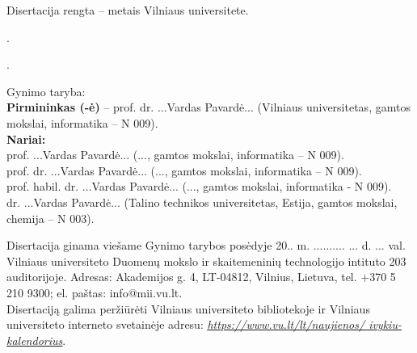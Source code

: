 \newpage
\thispagestyle{empty}                   %

\noindent\nohyphens{Disertacija rengta {\thesisPreparationStartYear}--{\thesisYear} metais Vilniaus universitete.}


\vspace{1cm}
.

.

\vspace{1cm}
\noindent
Gynimo taryba:  \\
{\bf Pirmininkas (-ė)} {-- {prof. dr. ...Vardas Pavardė...} (Vilniaus universitetas, gamtos mokslai, informatika -- N 009).\\}
{\bf Nariai:}\\ %
{prof. ...Vardas Pavardė...}
(..., gamtos mokslai, informatika -- N 009).\\
{prof. dr. ...Vardas Pavardė...}
(..., gamtos mokslai, informatika – N 009).\\
{prof. habil. dr. ...Vardas Pavardė...}
(..., gamtos mokslai, informatika - N 009).\\
{dr. ...Vardas Pavardė...}
(Talino technikos universitetas, Estija, gamtos mokslai, chemija -- N 003).


\vspace{2cm}
\noindent
Disertacija ginama viešame Gynimo tarybos posėdyje 20.. m. .......... ... d. ... val. Vilniaus universiteto Duomenų mokslo ir skaitemeninių technologijo intituto  203 auditorijoje. Adresas: Akademijos g. 4, LT-04812, Vilnius, Lietuva, tel. +370 5 210 9300; el. paštas: info@mii.vu.lt.\\

\vspace{1cm}
\noindent
Disertaciją galima peržiūrėti Vilniaus universiteto bibliotekoje ir Vilniaus universiteto interneto svetainėje adresu: 
\href{https://www.vu.lt/lt/naujienos/ivykiu-kalendorius}{ \textit{\underline{https://www.vu.lt/lt/naujienos/} \underline{ivykiu-kalendorius}}}. 

